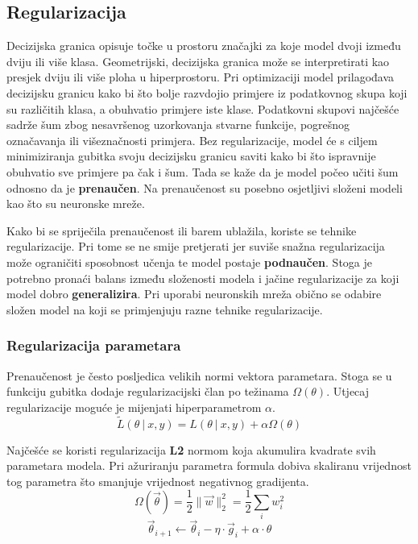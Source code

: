 \documentclass[times, utf8, numeric, diplomski]{fer}
\def\probsep{\ |\ }
\def\todoimg#1{\begin{center} \textcolor{red}{\big[ IMAGE: \textit{#1} \big]} \end{center}}
\begin{document}
\subsection{Regularizacija}
\label{sec:regularizacija}
Decizijska granica opisuje točke u prostoru značajki za koje model dvoji između dviju ili više klasa. Geometrijski, decizijska granica može se interpretirati kao presjek dviju ili više ploha u hiperprostoru. Pri optimizaciji model prilagođava decizijsku granicu kako bi što bolje razvdojio primjere iz podatkovnog skupa koji su različitih klasa, a obuhvatio primjere iste klase. Podatkovni skupovi najčešće sadrže šum zbog nesavršenog uzorkovanja stvarne funkcije, pogrešnog označavanja ili višeznačnosti primjera. Bez regularizacije, model će s ciljem minimiziranja gubitka svoju decizijsku granicu saviti kako bi što ispravnije obuhvatio sve primjere pa čak i šum. Tada se kaže da je model počeo učiti šum odnosno da je \textbf{prenaučen}. Na prenaučenost su posebno osjetljivi složeni modeli kao što su neuronske mreže.

\todoimg{podnaučena, generalizira, prenaučena}

Kako bi se spriječila prenaučenost ili barem ublažila, koriste se tehnike regularizacije. Pri tome se ne smije pretjerati jer suviše snažna regularizacija može ograničiti sposobnost učenja te model postaje \textbf{podnaučen}. Stoga je potrebno pronaći balans između složenosti modela i jačine regularizacije za koji model dobro \textbf{generalizira}. Pri uporabi neuronskih mreža obično se odabire složen model na koji se primjenjuju razne tehnike regularizacije.

\subsubsection{Regularizacija parametara}
Prenaučenost je često posljedica velikih normi vektora parametara. Stoga se u funkciju gubitka dodaje regularizacijski član po težinama $\Omega(\theta)$. Utjecaj regularizacije moguće je mijenjati hiperparametrom $\alpha$.
\begin{equation}
\label{eq:weights_regularization}
\tilde{L}(\theta \probsep x,y) = L(\theta \probsep x,y) + \alpha\Omega(\theta)
\end{equation}

Najčešće se koristi regularizacija \textbf{L2} normom koja akumulira kvadrate svih parametara modela. Pri ažuriranju parametra formula dobiva skaliranu vrijednost tog parametra što smanjuje vrijednost negativnog gradijenta.
\begin{equation}
\Omega(\vec{\theta}) = \frac{1}{2} \|\vec{w}\|_2^2 = \frac{1}{2} \sum_i w_i^2
\end{equation}
\begin{equation}
\vec{\theta}_{i+1} \gets \vec{\theta}_i - \eta \cdot \vec{g}_i + \alpha \cdot \theta
\end{equation}
\end{document}
